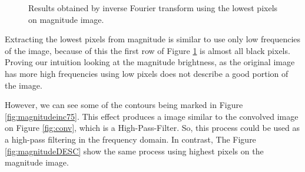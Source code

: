 \documentclass[12pt,a4paper]{article}
\begin{document}
\begin{figure}[!h]
{{		}
		\label{fig:magnitudeinc50}
	}
	\quad

	\caption{Results obtained by inverse Fourier transform using the lowest pixels on magnitude image.}
	\label{fig:magnitudeINC}
\end{figure}

Extracting the lowest pixels from magnitude is similar to use only low frequencies of the image, because of this the first row of Figure \ref{fig:magnitudeINC} is almost all black pixels. Proving our intuition looking at the magnitude brightness, as the original image has more high frequencies using low pixels does not describe a good portion of the image. \\

\newpage

However, we can see some of the contours being marked in Figure \ref{fig:magnitudeinc75}. This effect produces a image similar to the convolved image on Figure \ref{fig:conv}, which is a High-Pass-Filter. So, this process could be used as a high-pass filtering in the frequency domain. In contrast, The Figure \ref{fig:magnitudeDESC} show the same process using highest pixels on the magnitude image. \\
\end{document}
